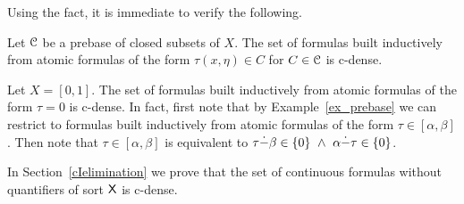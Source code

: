 \documentclass{amsproc}
\def\dotminus{\stackon[.2ex]{$-$}{$.$}}
\begin{document}
Using the fact, it is immediate to verify the following.

\begin{example}\label{ex_prebase}
  Let ${\EuScript C}$ be a prebase of closed subsets of $X$.
  The set of formulas built inductively from atomic formulas of the form $\tau(x,\eta)\in C$ for $C\in{\EuScript C}$ is c-dense.
\end{example}

\begin{example}
  Let $X=[0,1]$.
  The set of formulas built inductively from atomic formulas of the form $\tau=0$ is c-dense.
  In fact, first note that by Example~\ref{ex_prebase} we can restrict to formulas built inductively from atomic formulas of the form $\tau\in[\alpha,\beta]$.
  Then note that $\tau\in[\alpha,\beta]$ is equivalent to $\tau\dotminus\beta\in\{0\}\ \wedge\ \alpha\dotminus\tau\in\{0\}$.
\end{example}


In Section~\ref{cIelimination} we prove that the set of continuous formulas without quantifiers of sort ${\sf X}$ is c-dense.
 
\end{document}
